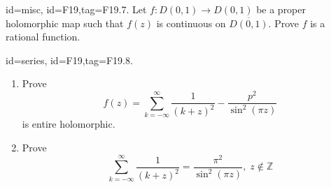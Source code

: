 \documentclass[12pt,letterpaper]{article}
\begin{document}
{\item[id=misc, id=F19,tag=F19.7.]
Let $f : D(0,1) \rightarrow D(0,1)$ be a proper holomorphic map such that $f(z)$ is continuous on $\overline{D(0,1)}$. Prove $f$ is a rational function.


\item[id=series, id=F19,tag=F19.8.]
\begin{enumerate}[label=(\alph*)]\onlyitems
\item Prove
\[
	f(z) = \sum_{k=-\infty}^{\infty} \frac{1}{(k+z)^2} - \frac{p^2}{\sin^2(\pi z)}
\]
is entire holomorphic.
\item Prove
\[
	\sum_{k=-\infty}^{\infty} \frac{1}{(k+z)^2} = \frac{\pi^2}{\sin^2(\pi z)}, \; z \notin \mathbb{Z}
\]
\end{enumerate}

}
\end{document}
